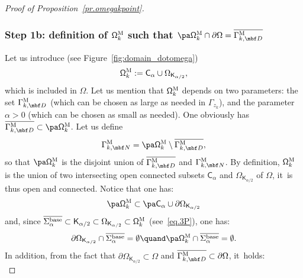 \begin{proof}[Proof of Proposition~\ref{pr.omegakpoint}]
\subsubsection*{Step 1b: definition of $\mathsf \Omega_k^{\textsc{M}}$ such that $ \pa \mathsf \Omega_k^{\textsc{M}} \cap \partial \Omega =\overline{\Gamma_{k,\mbf D}^{\text{M}}}$}
Let us introduce (see Figure~\ref{fig:domain_dotomega})
\begin{equation}\label{eq.DEFDOTOMEGA}
\mathsf \Omega_k^{\textsc{M}}:= \mathsf C_\alpha \cup\Omega_{\mathsf K_{\alpha/2}},
\end{equation}
which is included in $\Omega$. Let us mention that $ \mathsf
\Omega_k^{\textsc{M}}$ depends on two parameters: the set
$\Gamma_{k,\mbf D}^{\textsc{M}}$ (which can be chosen as large as
needed in $\Gamma_{z_k}$), and the parameter $\alpha>0$ (which can
be chosen as small as needed).
One obviously has $\overline{\Gamma_{k,\mbf D}^{\text{M}}}\subset \pa \mathsf \Omega_k^{\textsc{M}}$.
Let us define
\begin{equation}\label{eq.DEFDOTOMEGA2}
\Gamma_{k,\mbf N}^{\text{M}}= \pa \mathsf \Omega_k^{\textsc{M}}\setminus \overline{\Gamma_{k,\mbf D}^{\text{M}}},
\end{equation}
so that $ \pa \mathsf \Omega_k^{\textsc{M}}$ is the disjoint union of $\overline{\Gamma_{k,\mbf D}^{\text{M}}}$ and $ \Gamma_{k,\mbf N}^{\text{M}}$.
By definition, $\mathsf \Omega_k^{\textsc{M}} $ is the union of two intersecting open connected subsets $\mathsf C_\alpha$ and $\Omega_{\mathsf K_{\alpha/2}}$ of $\Omega$, it~is thus open and connected.
Notice that one has:
\begin{equation}\label{eq.unionboundary1}
\pa \mathsf \Omega_k^{\textsc{M}}\subset \pa \mathsf C_\alpha \cup \partial \Omega_{\mathsf K_{\alpha/2}}
\end{equation}
and, since $\overline{ \Sigma_\alpha^{\textup{base}}}\subset \mathsf K_{\alpha/2} \subset \Omega_{\mathsf K_{\alpha/2}} \subset \mathsf \Omega_{k}^{\textsc{M}}$ (see~\eqref{eq.3P}), one has:
\begin{equation}\label{eq.unionboundary2}
\partial \Omega_{\mathsf K_{\alpha/2}}\cap \overline{ \Sigma_\alpha^{\textup{base}}}=\emptyset \quand \pa \mathsf \Omega_k^{\textsc{M}}\cap \overline{ \Sigma_\alpha^{\textup{base}}}=\emptyset.
\end{equation}
In addition, from the fact that $\partial \Omega_{\mathsf K_{\alpha/2}} \subset \Omega$ and $\overline{\Gamma_{k,\mbf D}^{\text{M}}}\subset \partial \Omega$, it~holds:
\begin{equation}\label{eq.unionboundary3}

\end{equation}
\end{proof}
